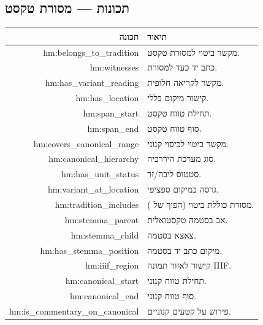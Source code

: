\documentclass[12pt,a4paper]{article}
\newcommand{\en}[1]{\textenglish{\LR{#1}}}
\newcommand{\new}[1]{\textcolor{newaddition}{#1}}
\newcommand{\newprop}[1]{\textcolor{newaddition}{#1}}
\begin{document}
\subsection{\new{תכונות   — מסורת טקסט}}

\begin{longtable}{|r|p{8cm}|}
\hline
\textbf{תכונה} & \textbf{תיאור} \\
\hline
\endhead

\newprop{hm:belongs\_to\_tradition} & \new{מקשר ביטוי למסורת טקסט.}\\
\hline
\newprop{hm:witnesses} & \new{כתב יד כעד למסורת.}\\
\hline
\newprop{hm:has\_variant\_reading} & \new{מקשר לקריאה חלופית.}\\
\hline
\newprop{hm:has\_location} & \new{קישור מיקום כללי.}\\
\hline
\newprop{hm:span\_start} & \new{תחילת טווח טקסט.}\\
\hline
\newprop{hm:span\_end} & \new{סוף טווח טקסט.}\\
\hline
\newprop{hm:covers\_canonical\_range} & \new{מקשר ביטוי לכיסוי קנוני.}\\
\hline
\newprop{hm:canonical\_hierarchy} & \new{סוג מערכת היררכיה.}\\
\hline
\newprop{hm:has\_unit\_status} & \new{סטטוס ליבה/זר.}\\
\hline

\newprop{hm:variant\_at\_location} & \new{גרסה במיקום ספציפי.}\\
\hline

\newprop{hm:tradition\_includes} & \new{מסורת כוללת ביטוי (הפוך של \en{belongs\_to\_tradition}).}\\
\hline

\newprop{hm:stemma\_parent} & \new{אב בסטמה טקסטואלית.}\\
\hline

\newprop{hm:stemma\_child} & \new{צאצא בסטמה.}\\
\hline

\newprop{hm:has\_stemma\_position} & \new{מיקום כתב יד בסטמה.}\\
\hline

\newprop{hm:iiif\_region} & \new{קישור לאזור תמונה IIIF.}\\
\hline

\newprop{hm:canonical\_start} & \new{תחילת טווח קנוני.}\\
\hline

\newprop{hm:canonical\_end} & \new{סוף טווח קנוני.}\\
\hline

\newprop{hm:is\_commentary\_on\_canonical} & \new{פירוש על קטעים קנוניים.}\\
\hline
\end{longtable}
\end{document}
